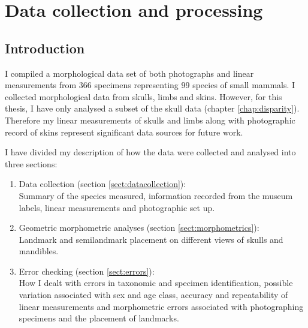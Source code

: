 
\chapter{Data collection and processing}
\label{chap:methods}

\section{Introduction}

	I compiled a morphological data set of both photographs and linear measurements from 366 specimens representing 99 species of small mammals. 
	I collected morphological data from skulls, limbs and skins. However, for this thesis, I have only analysed a subset of the skull data (chapter \ref{chap:disparity}). Therefore my linear measurements of skulls and limbs along with photographic record of skins represent significant data sources for future work. 
	
	I have divided my description of how the data were collected and analysed into three sections:
	
	\begin{enumerate}[i]
	
	\item Data collection (section \ref{sect:datacollection}): \\
	Summary of the species measured, information recorded from the museum labels, linear measurements and photographic set up.
	
	\item Geometric morphometric analyses (section \ref{sect:morphometrics}):\\
	Landmark and semilandmark placement on different views of skulls and mandibles.
	
	\item Error checking (section \ref{sect:errors}): \\
	How I dealt with errors in taxonomic and specimen identification, possible variation associated with sex and age class, accuracy and repeatability of linear measurements and morphometric errors associated with photographing specimens and the placement of landmarks.
	

	
	\end{enumerate} 


